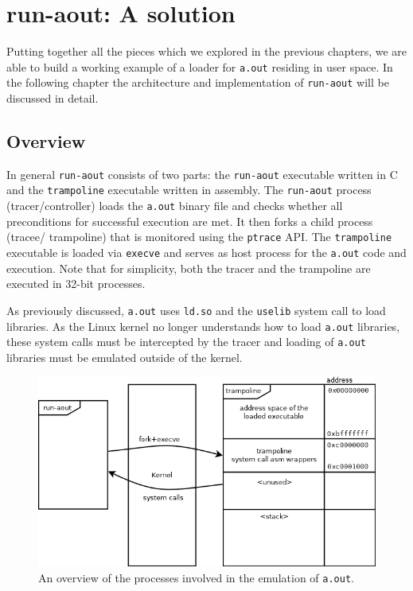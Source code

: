 \documentclass[draft,final]{vutinfth} %
\begin{document}
\chapter{run-aout: A solution}
\label{solution}

Putting together all the pieces which we explored in the previous chapters, we are able to build a working example of a loader for \texttt{a.out} residing in user space. In the following chapter the architecture and implementation of \texttt{run-aout} will be discussed in detail.

\section{Overview}
\label{solution_overview}

In general \texttt{run-aout} consists of two parts: the \texttt{run-aout} executable written in C and the \texttt{trampoline} executable written in assembly. The \texttt{run-aout} process (tracer/controller) loads the \texttt{a.out} binary file and checks whether all preconditions for successful execution are met. It then forks a child process (tracee/ trampoline) that is monitored using the \texttt{ptrace} API. The \texttt{trampoline} executable is loaded via \texttt{execve} and serves as host process for the \texttt{a.out} code and execution. Note that for simplicity, both the tracer and the trampoline are executed in 32-bit processes.

As previously discussed, \texttt{a.out} uses \texttt{ld.so} and the \texttt{uselib} system call to load libraries. As the Linux kernel no longer understands how to load \texttt{a.out} libraries, these system calls must be intercepted by the tracer and loading of \texttt{a.out} libraries must be emulated outside of the kernel.

\begin{figure}[H]
    \centering
    \includegraphics[scale=0.5]{run-aout.png}
    \caption{An overview of the processes involved in the emulation of \texttt{a.out}.}
    \label{fig:architecture_overview}
\end{figure}
\end{document}
